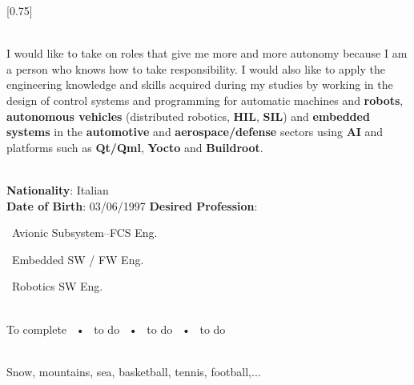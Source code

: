 \documentclass[lighthipster]{simplehipstercv}
\begin{document}
    \setlength{\columnsep}{1.5cm}
    [0.75]
    \begin{paracol}{2}
    
    \paracolbackgroundoptions
    
    
    
    \footnotesize
    {
    \setasidefontcolour
    \flushright
    \begin{center}
    \end{center}
    
    \\[0.5em]
        {\footnotesize 
        I would like to take on roles that give me more and more autonomy because I am a person who knows how to take
        responsibility. I would also like to apply the engineering
        knowledge and skills acquired during my studies by working in the
        design of control systems and programming for automatic
        machines and \textbf{robots}, \textbf{autonomous vehicles} (distributed robotics,
        \textbf{HIL}, \textbf{SIL}) and \textbf{embedded systems} in the \textbf{automotive} and
        \textbf{aerospace/defense} sectors using \textbf{AI} and platforms such as \textbf{Qt/Qml},
        \textbf{Yocto} and \textbf{Buildroot}.
        }
    \bigskip
    
     \\[0.5em]
    \textbf{Nationality}: Italian \\
    \textbf{Date of Birth}: 03/06/1997
    \textbf{Desired Profession}: \par \textbullet\ Avionic Subsystem--FCS Eng. \par 
    \textbullet\ Embedded SW / FW Eng. \par
    \textbullet\ Robotics SW Eng.
    
    \bigskip
    
     \\[0.5em]
    To complete ~•~ to do ~•~ to do ~•~ to do
    
    \bigskip
    
    \bigskip
    
    \\[0.5em]
    Snow, mountains, sea, basketball, tennis, football,...
    \bigskip
    
}
\end{paracol}
\end{document}
